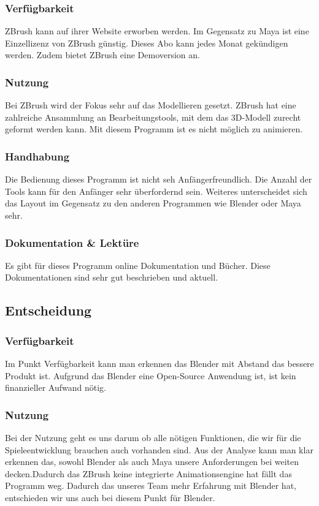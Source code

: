 \subsubsection{Verfügbarkeit}
ZBrush kann auf ihrer Website erworben werden. Im Gegensatz zu Maya ist eine Einzellizenz von ZBrush günstig. Dieses Abo kann jedes Monat gekündigen werden. Zudem bietet ZBrush eine Demoversion an.

\subsubsection{Nutzung}
Bei ZBrush wird der Fokus sehr auf das Modellieren gesetzt. ZBrush hat eine zahlreiche Ansammlung an Bearbeitungstools, mit dem das 3D-Modell zurecht geformt werden kann. Mit diesem Programm ist es nicht möglich zu animieren.

\subsubsection{Handhabung}
Die Bedienung dieses Programm ist nicht seh Anfängerfreundlich. Die Anzahl der Tools kann für den Anfänger sehr überfordernd sein. Weiteres unterscheidet sich das Layout im Gegensatz zu den anderen Programmen wie Blender oder Maya sehr.

\subsubsection{Dokumentation \& Lektüre}
Es gibt für dieses Programm online Dokumentation und Bücher. Diese Dokumentationen sind sehr gut beschrieben und aktuell.

\pagebreak

\subsection{Entscheidung}
\subsubsection{Verfügbarkeit}
Im Punkt Verfügbarkeit kann man erkennen das Blender mit Abstand das bessere Produkt ist. Aufgrund das Blender eine Open-Source Anwendung ist, ist kein finanzieller Aufwand nötig.

\subsubsection{Nutzung}
Bei der Nutzung geht es uns darum ob alle nötigen Funktionen, die wir für die Spieleentwicklung brauchen auch vorhanden sind. Aus der Analyse kann man klar erkennen das, sowohl Blender als auch Maya unsere Anforderungen bei weiten decken.Dadurch das ZBrush keine integrierte Animationsengine hat fällt das Programm weg. Dadurch das unseres Team mehr Erfahrung mit Blender hat, entschieden wir uns auch bei diesem Punkt für Blender.

